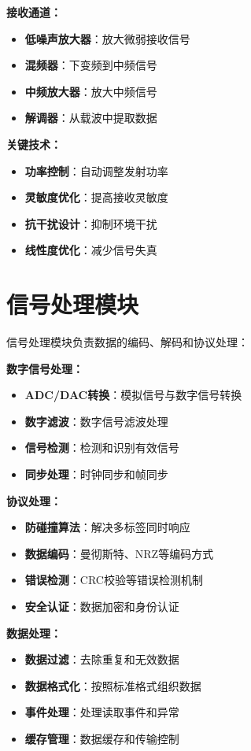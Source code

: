 \documentclass[12pt,UTF8]{ctexbook}
\begin{document}
\begin{itemize}[leftmargin=3.5em]
\begin{itemize}[leftmargin=3.5em]
\textbf{接收通道：}
\begin{itemize}[leftmargin=3.5em]
    \item \textbf{低噪声放大器}：放大微弱接收信号
    \item \textbf{混频器}：下变频到中频信号
    \item \textbf{中频放大器}：放大中频信号
    \item \textbf{解调器}：从载波中提取数据
\end{itemize}

\textbf{关键技术：}
\begin{itemize}[leftmargin=3.5em]
    \item \textbf{功率控制}：自动调整发射功率
    \item \textbf{灵敏度优化}：提高接收灵敏度
    \item \textbf{抗干扰设计}：抑制环境干扰
    \item \textbf{线性度优化}：减少信号失真
\end{itemize}

\section{信号处理模块}

信号处理模块负责数据的编码、解码和协议处理：

\textbf{数字信号处理：}
\begin{itemize}[leftmargin=3.5em]
    \item \textbf{ADC/DAC转换}：模拟信号与数字信号转换
    \item \textbf{数字滤波}：数字信号滤波处理
    \item \textbf{信号检测}：检测和识别有效信号
    \item \textbf{同步处理}：时钟同步和帧同步
\end{itemize}

\textbf{协议处理：}
\begin{itemize}[leftmargin=3.5em]
    \item \textbf{防碰撞算法}：解决多标签同时响应
    \item \textbf{数据编码}：曼彻斯特、NRZ等编码方式
    \item \textbf{错误检测}：CRC校验等错误检测机制
    \item \textbf{安全认证}：数据加密和身份认证
\end{itemize}

\textbf{数据处理：}
\begin{itemize}[leftmargin=3.5em]
    \item \textbf{数据过滤}：去除重复和无效数据
    \item \textbf{数据格式化}：按照标准格式组织数据
    \item \textbf{事件处理}：处理读取事件和异常
    \item \textbf{缓存管理}：数据缓存和传输控制
\end{itemize}


\end{itemize}
\end{itemize}
\end{document}
